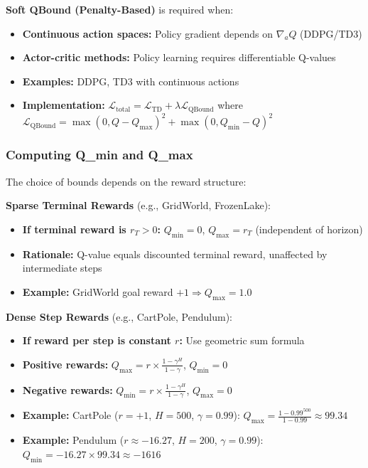 \documentclass[11pt]{article}
\theoremstyle{definition}
\theoremstyle{remark}
\begin{document}
\textbf{Soft QBound (Penalty-Based)} is required when:
\begin{itemize}
    \item \textbf{Continuous action spaces:} Policy gradient depends on $\nabla_a Q$ (DDPG/TD3)
    \item \textbf{Actor-critic methods:} Policy learning requires differentiable Q-values
    \item \textbf{Examples:} DDPG, TD3 with continuous actions
    \item \textbf{Implementation:} $\mathcal{L}_{\text{total}} = \mathcal{L}_{\text{TD}} + \lambda \mathcal{L}_{\text{QBound}}$ where $\mathcal{L}_{\text{QBound}} = \max(0, Q-Q_{\max})^2 + \max(0, Q_{\min}-Q)^2$
\end{itemize}

\subsubsection{Computing Q\_min and Q\_max}

The choice of bounds depends on the reward structure:

\textbf{Sparse Terminal Rewards} (e.g., GridWorld, FrozenLake):
\begin{itemize}
    \item \textbf{If terminal reward is $r_T > 0$:} $Q_{\min} = 0$, $Q_{\max} = r_T$ (independent of horizon)
    \item \textbf{Rationale:} Q-value equals discounted terminal reward, unaffected by intermediate steps
    \item \textbf{Example:} GridWorld goal reward $+1 \Rightarrow Q_{\max} = 1.0$
\end{itemize}

\textbf{Dense Step Rewards} (e.g., CartPole, Pendulum):
\begin{itemize}
    \item \textbf{If reward per step is constant $r$:} Use geometric sum formula
    \item \textbf{Positive rewards:} $Q_{\max} = r \times \frac{1 - \gamma^H}{1 - \gamma}$, $Q_{\min} = 0$
    \item \textbf{Negative rewards:} $Q_{\min} = r \times \frac{1 - \gamma^H}{1 - \gamma}$, $Q_{\max} = 0$
    \item \textbf{Example:} CartPole ($r=+1$, $H=500$, $\gamma=0.99$): $Q_{\max} = \frac{1-0.99^{500}}{1-0.99} \approx 99.34$
    \item \textbf{Example:} Pendulum ($r \approx -16.27$, $H=200$, $\gamma=0.99$): $Q_{\min} = -16.27 \times 99.34 \approx -1616$
\end{itemize}
\end{document}

